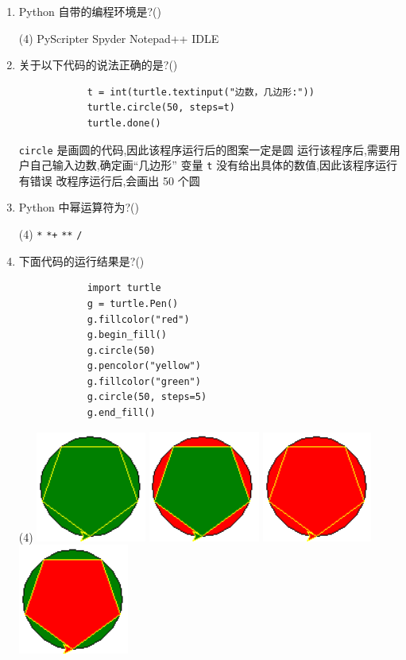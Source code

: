 \documentclass[11pt]{ctexart}
\begin{document}
    \begin{enumerate}
        \item Python 自带的编程环境是?(\qquad)
        \begin{tasks}(4)
            \task PyScripter
            \task Spyder
            \task Notepad++
            \task IDLE
        \end{tasks}

        \item 关于以下代码的说法正确的是?(\qquad)
        \begin{lstlisting}
            t = int(turtle.textinput("边数，几边形:"))
            turtle.circle(50, steps=t)
            turtle.done()
        \end{lstlisting}
        \begin{tasks}
            \task \lstinline{circle} 是画圆的代码,因此该程序运行后的图案一定是圆
            \task 运行该程序后,需要用户自己输入边数,确定画“几边形”
            \task 变量 \lstinline{t} 没有给出具体的数值,因此该程序运行有错误
            \task 改程序运行后,会画出 50 个圆
        \end{tasks}

        \item Python 中幂运算符为?(\qquad)
        \begin{tasks}(4)
            \task \lstinline{*}
            \task \lstinline{*+}
            \task \lstinline{**}
            \task \lstinline{/}
        \end{tasks}

        \item 下面代码的运行结果是?(\qquad)
        \begin{lstlisting}
            import turtle
            g = turtle.Pen()
            g.fillcolor("red")
            g.begin_fill()
            g.circle(50)
            g.pencolor("yellow")
            g.fillcolor("green")
            g.circle(50, steps=5)
            g.end_fill()
        \end{lstlisting}
        \begin{tasks}(4)
            \task \includegraphics[width=.08\textwidth]{4a.png}
            \task \includegraphics[width=.08\textwidth]{4b.png}
            \task \includegraphics[width=.08\textwidth]{4c.png}
            \task \includegraphics[width=.08\textwidth]{4d.png}
        \end{tasks}


\end{enumerate}
\end{document}
